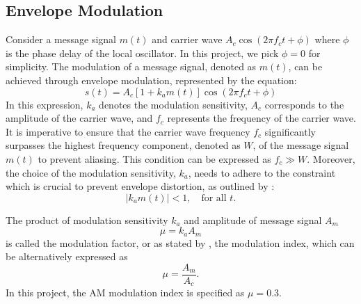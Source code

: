 \documentclass[../ECE459FinalProjectReport.tex]{subfiles}
\begin{document}
\subsection{Envelope Modulation}
Consider a message signal $m\left(t\right)$ and carrier wave $A_c \cos\left(2\pi f_c t + \phi\right)$ where $\phi$ is the phase delay of the local oscillator. In this project, we pick $\phi = 0$ for simplicity. The modulation of a message signal, denoted as $m\left(t\right)$, can be achieved through envelope modulation, represented by the equation:
\begin{equation}
    s\left(t\right) = A_c \left[1 + k_a m\left(t\right)\right] \cos \left(2\pi f_c t + \phi\right)
\end{equation}
In this expression, $k_a$ denotes the modulation sensitivity, $A_c$ corresponds to the amplitude of the carrier wave, and $f_c$ represents the frequency of the carrier wave. It is imperative to ensure that the carrier wave frequency $f_c$ significantly surpasses the highest frequency component, denoted as $W$, of the message signal $m\left(t\right)$ to prevent aliasing. This condition can be expressed as $f_c \gg W$. Moreover, the choice of the modulation sensitivity, $k_a$, needs to adhere to the constraint which is crucial to prevent envelope distortion, as outlined by \textcite[pp. 101--102]{haykinIntroductionAnalogDigital2007}:
\begin{equation}
    \left| k_a m\left(t\right) \right| < 1, \quad \text{for all }t.
\end{equation}

The product of modulation sensitivity $k_a$ and amplitude of message signal $A_m$
\begin{equation}
    \mu = k_a A_m
\end{equation}
is called the modulation factor, or as stated by \cite{sasmitaModulationIndexModulation2020}, the modulation index, which can be alternatively expressed as
\begin{equation}
    \mu = \frac{A_m}{A_c}.
\end{equation}
In this project, the AM modulation index is specified as $\mu=0.3$.
\end{document}
